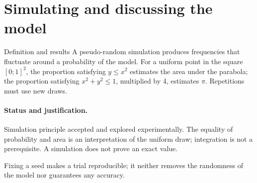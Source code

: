 \section{Simulating and discussing the model}\label{C05-U5}
\begin{repere}{Definition and results}
A pseudo-random simulation produces frequencies that fluctuate around a probability of the model. For a uniform point in the square $[0;1]^2$, the proportion satisfying $y\leq x^2$ estimates the area under the parabola; the proportion satisfying $x^2+y^2\leq1$, multiplied by 4, estimates $\pi$. Repetitions must use new draws.
\end{repere}
\paragraph{Status and justification.} Simulation principle accepted and explored experimentally. The equality of probability and area is an interpretation of the uniform draw; integration is not a prerequisite. A simulation does not prove an exact value.
\label{C05-EX5}
\begin{erreur}Fixing a seed makes a trial reproducible; it neither removes the randomness of the model nor guarantees any accuracy.\end{erreur}
\clearpage
{}\label{C05-AP5}
